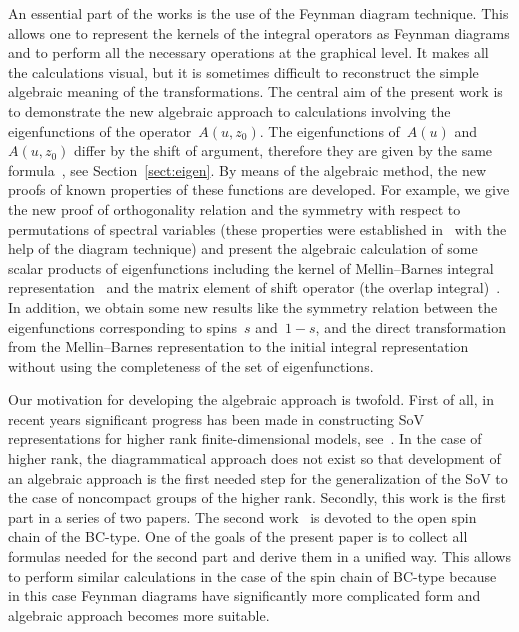 \documentclass[pdftex]{sigma}
\numberwithin{equation}{section}
\begin{document}
An essential part of the works \cite{DKM,DM2}
is the use of the Feynman diagram technique.
This allows one to represent the kernels of the integral operators as Feynman diagrams
and to perform all the necessary operations at the graphical level.
It makes all the calculations visual, but it is sometimes difficult to reconstruct the simple algebraic meaning of the transformations.
The central aim of the present work is to demonstrate the new algebraic approach to calculations involving the eigenfunctions of the operator~$A(u,z_0)$.
The eigenfunctions of~$A(u)$ and~$A(u,z_0)$ differ by the shift of argument, therefore they are given by the same formula~\cite{DM2}, see Section~\ref{sect:eigen}.
By means of the algebraic method, the new proofs of known properties of these functions are developed.
For example, we give the new proof of orthogonality relation and the symmetry with respect to permutations of spectral variables (these properties were established in~\cite{DKO,DM2} with the help of the diagram technique)
and present the algebraic calculation of some scalar products of eigenfunctions including the kernel of Mellin--Barnes integral representation~\cite{Val20} and the matrix element of shift operator (the overlap integral)~\cite{DMV2}.
In addition, we obtain some new results like the symmetry relation between the eigenfunctions corresponding to spins~$s$ and~$1-s$, and the direct transformation from the Mellin--Barnes representation to the initial integral representation without using the completeness of the set of eigenfunctions.

Our motivation for developing the algebraic approach is twofold.
First of all, in recent years significant progress has been made in constructing SoV representations for higher rank finite-dimensional models, see~\cite{Cavaglia:2019pow,GromovRyan20,GromovSizov17,Gromov:2022waj,Levk,MailletNiccoli18,
MR3983970,MailletNiccoli19,Maillet:2020ykb,Ryan:2021duf,RyanVolin19,
Ryan:2020rfk}.
In the case of higher rank, the diagrammatical approach does not exist
so that development of an algebraic approach is the first needed step for the generalization of the SoV to the case of noncompact groups of the higher rank.
Secondly, this work is the first part in a series of two papers.
The second work~\cite{ADV2} is devoted to the open spin chain of the BC-type.
One of the goals of the present paper is to collect all formulas needed
for the second part and derive them in a unified way.
This allows to perform similar calculations in the case of the spin chain
of BC-type because in this case Feynman diagrams have significantly more
complicated form and algebraic approach becomes more suitable.
\end{document}
